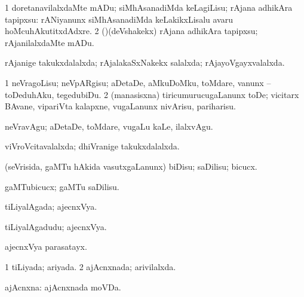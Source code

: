\bentry
{} 
\gl{\sakirx}
\expl{}
\bmng
\bnum
\num{1} doretanavilalxdaMte mADu; siMhAsanadiMda keLagiLisu; rAjana adhikAra tapipxsu:  rANiyanunx siMhAsanadiMda keLakikxLisalu avaru hoMcuhAkutitxdAdxre. 
\num{2} (\pArxparx)(deVshakekx) rAjana adhikAra tapipxsu; rAjanilalxdaMte mADu. 
\enum
\emng
\eentry

\bentry
{} 
\gl{\gu}
\expl{}
\bmng
rAjanige takukxdalalxda; rAjalakaSxNakekx salalxda; rAjayoVgayxvalalxda. 
\emng
\eentry

\bentry
{} 
\gl{\sakirx}
\expl{}
\bmng
\bnum
\num{1} neVragoLisu; neVpARgisu; aDetaDe, aMkuDoMku, toMdare, \mo vanunx -- toDeduhAku, tegedubiDu. 
\num{2} (manasisxna) tiricumurucugaLanunx toDe; vicitarx BAvane, vipariVta kalapxne, \mo vugaLanunx nivArisu, pariharisu. 
\enum
\emng

\noindent
\gl{\akirx}
\expl{}
\bmng
neVravAgu; aDetaDe, toMdare, \mo vugaLu kaLe, ilalxvAgu. 
\emng
\eentry

\bentry
{} 
\gl{\gu}
\expl{}
\bmng
viVroVcitavalalxda; dhiVranige takukxdalalxda. 
\emng
\eentry

\bentry
{} 
\gl{\akirx}
\bmng
(seVrisida, gaMTu hAkida vasutxgaLanunx) biDisu; saDilisu; bicucx. 
\emng
\eentry

\bentry
{} 
\gl{\akirx}
\bmng
gaMTubicucx; gaMTu saDilisu. 
\emng
\eentry

\bentry
{} 
\gl{\gu}
\expl{}
\bmng
tiLiyalAgada; ajecnxVya. 
\emng
\eentry

\bentry
{} 
\gl{\nA}
\expl{}
\bmng
tiLiyalAgadudu; ajecnxVya. 
\emng

\noindent
\gl{\pagu}
\expl{}
\bmng
{} ajecnxVya parasatayx. 
\emng
\eentry

\bentry
{} 
\gl{\gu}
\expl{}
\bmng
\bnum
\num{1} tiLiyada; ariyada. 
\num{2} ajAcnxnada; arivilalxda. 
\enum
\emng
\eentry

\bentry
{} 
\gl{\nA}
\expl{}
\bmng
ajAcnxna:  ajAcnxnada moVDa. 
\emng
\eentry


